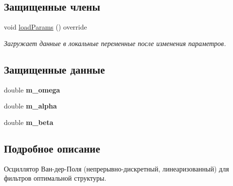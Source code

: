 \subsection*{Защищенные члены}
\begin{DoxyCompactItemize}
\item 
void \hyperlink{class_tasks_1_1_continuous_discrete_1_1_van_der_pol_linear_ab69c35a56affe59f0f7401e6c3675d14}{load\+Params} () override\hypertarget{class_tasks_1_1_continuous_discrete_1_1_van_der_pol_linear_ab69c35a56affe59f0f7401e6c3675d14}{}\label{class_tasks_1_1_continuous_discrete_1_1_van_der_pol_linear_ab69c35a56affe59f0f7401e6c3675d14}

\begin{DoxyCompactList}\small\item\em Загружает данные в локальные переменные после изменения параметров. \end{DoxyCompactList}\end{DoxyCompactItemize}
\subsection*{Защищенные данные}
\begin{DoxyCompactItemize}
\item 
double {\bfseries m\+\_\+omega}\hypertarget{class_tasks_1_1_continuous_discrete_1_1_van_der_pol_linear_a974f4658bee500533be49e053f15172f}{}\label{class_tasks_1_1_continuous_discrete_1_1_van_der_pol_linear_a974f4658bee500533be49e053f15172f}

\item 
double {\bfseries m\+\_\+alpha}\hypertarget{class_tasks_1_1_continuous_discrete_1_1_van_der_pol_linear_a6e09423b369c869ea4721e465845912a}{}\label{class_tasks_1_1_continuous_discrete_1_1_van_der_pol_linear_a6e09423b369c869ea4721e465845912a}

\item 
double {\bfseries m\+\_\+beta}\hypertarget{class_tasks_1_1_continuous_discrete_1_1_van_der_pol_linear_a9ca2f773ce65c2b69fea3a4a451afd59}{}\label{class_tasks_1_1_continuous_discrete_1_1_van_der_pol_linear_a9ca2f773ce65c2b69fea3a4a451afd59}

\end{DoxyCompactItemize}


\subsection{Подробное описание}
Осциллятор Ван-\/дер-\/Поля (непрерывно-\/дискретный, линеаризованный) для фильтров оптимальной структуры. 

